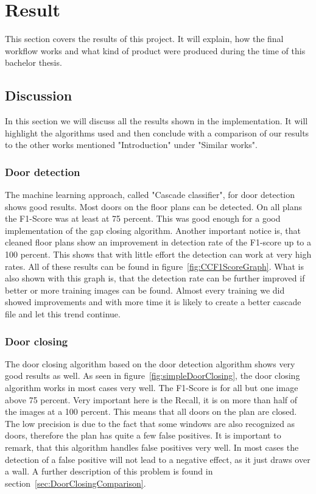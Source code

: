 \section{Result}
This section covers the results of this project. It will explain, how the final workflow works and what kind of product were produced during the time of this bachelor thesis.

\subsection{Discussion}
\label{sub:Discussion}
In this section we will discuss all the results shown in the implementation. It will highlight the algorithms used and then conclude with a comparison of our results to the other works mentioned "Introduction" under "Similar works".

\subsubsection{Door detection}
The machine learning approach, called "Cascade classifier", for door detection shows good results. Most doors on the floor plans can be detected. On all plans the F1-Score was at least at 75 percent. This was good enough for a good implementation of the gap closing algorithm. Another important notice is, that cleaned floor plans show an improvement in detection rate of the F1-score up to a 100 percent. This shows that with little effort the detection can work at very high rates. All of these results can be found in figure~\ref{fig:CCF1ScoreGraph}. What is also shown with this graph is, that the detection rate can be further improved if better or more training images can be found. Almost every training we did showed improvements and with more time it is likely to create a better cascade file and let this trend continue.

\subsubsection{Door closing}
The door closing algorithm based on the door detection algorithm shows very good results as well. As seen in figure~\ref{fig:simpleDoorClosing}, the door closing algorithm works in most cases very well. The F1-Score is for all but one image above 75 percent. Very important here is the Recall, it is on more than half of the images at a 100 percent. This means that all doors on the plan are closed. The low precision is due to the fact that some windows are also recognized as doors, therefore the plan has quite a few false positives. It is important to remark, that this algorithm handles false positives very well. In most cases the detection of a false positive will not lead to a negative effect, as it just draws over a wall. A further description of this problem is found in section~\ref{sec:DoorClosingComparison}.

